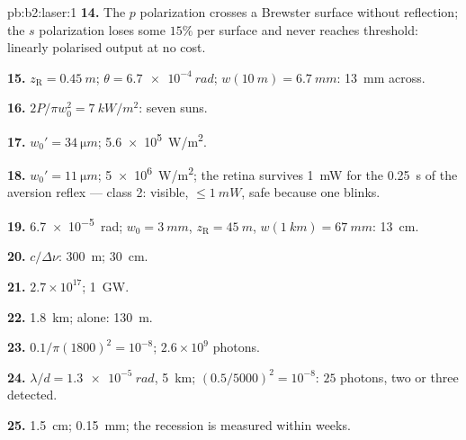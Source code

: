 \begin{solution}{pb:b2:laser:1}
\textbf{14.} The $p$ polarization crosses a Brewster surface without
reflection; the $s$ polarization loses some $15\%$ per surface and
never reaches threshold: linearly polarised output at no cost.

\textbf{15.} $z_{\text{R}} = \qty{0.45}{m}$; $\theta = \qty{6.7e-4}{rad}$; $w(\qty{10}{m})
= \qty{6.7}{mm}$: \qty{13}{mm} across.

\textbf{16.} $2P/\pi w_0^2 = \qty{7}{kW/m^2}$: seven suns.

\textbf{17.} $w_0' = \qty{34}{\micro m}$; \qty{5.6e5}{W/m^2}.

\textbf{18.} $w_0' = \qty{11}{\micro m}$; \qty{5e6}{W/m^2}; the retina survives
\qty{1}{mW} for the \qty{0.25}{s} of the aversion reflex --- class 2: visible,
$\le \qty{1}{mW}$, safe because one blinks.

\textbf{19.} \qty{6.7e-5}{rad}; $w_0 = \qty{3}{mm}$, $z_{\text{R}} = \qty{45}{m}$,
$w(\qty{1}{km}) = \qty{67}{mm}$: \qty{13}{cm}.

\textbf{20.} $c/\Delta\nu$: \qty{300}{m}; \qty{30}{cm}.

\textbf{21.} $2.7 \times 10^{17}$; \qty{1}{GW}.

\textbf{22.} \qty{1.8}{km};  alone: \qty{130}{m}.

\textbf{23.} $0.1/\pi(1800)^2 = 10^{-8}$; $2.6 \times 10^9$ photons.

\textbf{24.} $\lambda/d = \qty{1.3e-5}{rad}$, \qty{5}{km}; $(0.5/5000)^2 = 10^{-8}$:
$25$ photons, two or three detected.

\textbf{25.} \qty{1.5}{cm}; \qty{0.15}{mm}; the recession is measured within
weeks.
\end{solution}
